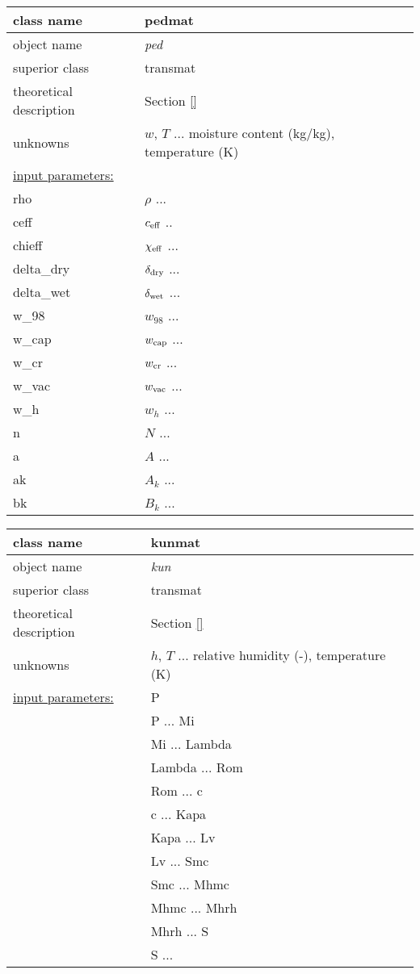 \begin{center}
\begin{tabular}{|l|l|}
\hline
class name & {\sf pedmat}\index{class!{\sf pedmat}}
\\ \hline
object name & {\it ped}\index{instance!{\it pedersen}}
\\ \hline
superior class & {\sf transmat}
\\ \hline
theoretical description & Section \ref{}
\\ \hline
unknowns & $w$, $T$ ... moisture content (kg/kg), temperature (K)
\\ \hline
\underline{input parameters:}  & 
 \\ rho & $\rho$ ...  
 \\ ceff & $c_{\rm eff}$ .. 
 \\ chieff & $\chi_{\rm eff}$ ... 
 \\ delta\_dry & $\delta_{\rm dry}$ ... 
 \\ delta\_wet & $\delta_{\rm wet}$ ... 
 \\ w\_98 & $w_{98}$ ... 
 \\ w\_cap & $w_{\rm cap}$ ... 
 \\ w\_cr & $w_{\rm cr}$ ... 
 \\ w\_vac & $w_{\rm vac}$ ... 
 \\ w\_h & $w_h$ ... 
 \\ n & $N$ ... 
 \\ a & $A$ ... 
 \\ ak & $A_k$ ... 
 \\ bk & $B_k$ ... 
\\ \hline
\end{tabular}
\end{center}



\begin{center}
\begin{tabular}{|l|l|}
\hline
class name & {\sf kunmat}\index{class!{\sf kunmat}}
\\ \hline
object name & {\it kun}\index{instance!{\it kunzel}}
\\ \hline
superior class & {\sf transmat}
\\ \hline
theoretical description & Section \ref{}
\\ \hline
unknowns & $h$, $T$ ... relative humidity (-), temperature (K)
\\ \hline
\underline{input parameters:}  & 
 P \\ & P ...  
 Mi \\ & Mi ... 
 Lambda \\ & Lambda ... 
 Rom \\ & Rom ... 
 c \\ & c ... 
 Kapa \\ & Kapa ... 
 Lv \\ & Lv ... 
 Smc \\ & Smc ... 
 Mhmc \\ & Mhmc ... 
 Mhrh \\ & Mhrh ... 
 S \\ & S ... 
\\ \hline
\end{tabular}
\end{center}


